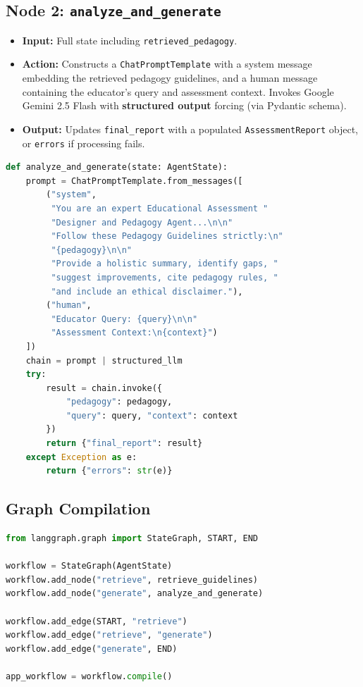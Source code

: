 \documentclass[12pt, a4paper, twoside]{article}
\newcommand{\code}[1]{\texttt{#1}}
\begin{document}
\subsection{Node 2: \code{analyze\_and\_generate}}

\begin{itemize}[leftmargin=2em]
    \item \textbf{Input:} Full state including \code{retrieved\_pedagogy}.
    \item \textbf{Action:} Constructs a \code{ChatPromptTemplate} with
          a system message embedding the retrieved pedagogy guidelines,
          and a human message containing the educator's query and
          assessment context. Invokes Google Gemini 2.5 Flash with
          \textbf{structured output} forcing (via Pydantic schema).
    \item \textbf{Output:} Updates \code{final\_report} with a
          populated \code{AssessmentReport} object, or
          \code{errors} if processing fails.
\end{itemize}

\begin{lstlisting}[language=Python,
  caption={Generation node (\code{agent/workflow.py}).}]
def analyze_and_generate(state: AgentState):
    prompt = ChatPromptTemplate.from_messages([
        ("system",
         "You are an expert Educational Assessment "
         "Designer and Pedagogy Agent...\n\n"
         "Follow these Pedagogy Guidelines strictly:\n"
         "{pedagogy}\n\n"
         "Provide a holistic summary, identify gaps, "
         "suggest improvements, cite pedagogy rules, "
         "and include an ethical disclaimer."),
        ("human",
         "Educator Query: {query}\n\n"
         "Assessment Context:\n{context}")
    ])
    chain = prompt | structured_llm
    try:
        result = chain.invoke({
            "pedagogy": pedagogy,
            "query": query, "context": context
        })
        return {"final_report": result}
    except Exception as e:
        return {"errors": str(e)}
\end{lstlisting}

\subsection{Graph Compilation}

\begin{lstlisting}[language=Python,
  caption={Graph definition and compilation (\code{agent/workflow.py}).}]
from langgraph.graph import StateGraph, START, END

workflow = StateGraph(AgentState)
workflow.add_node("retrieve", retrieve_guidelines)
workflow.add_node("generate", analyze_and_generate)

workflow.add_edge(START, "retrieve")
workflow.add_edge("retrieve", "generate")
workflow.add_edge("generate", END)

app_workflow = workflow.compile()
\end{lstlisting}
\end{document}
